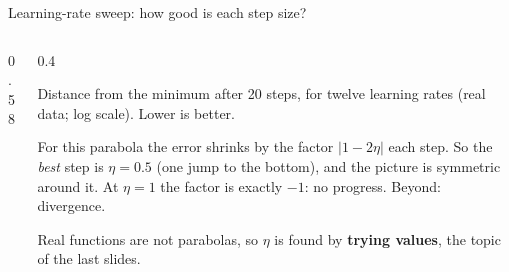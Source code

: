 \documentclass[aspectratio=169,10pt]{beamer}
\begin{document}
\begin{frame}{Learning-rate sweep: how good is each step size?}
\begin{columns}[T]
\begin{column}{0.58\textwidth}
\begin{sfig}[0.85]
\end{sfig}
\end{column}
\begin{column}{0.4\textwidth}
{\small
Distance from the minimum after 20 steps, for twelve learning rates (real data; log scale). Lower is better.

\vspace{2mm}
For this parabola the error shrinks by the factor $|1-2\eta|$ each step. So the \emph{best} step is $\eta=0.5$ (one jump to the bottom), and the picture is symmetric around it. At $\eta=1$ the factor is exactly $-1$: no progress. Beyond: divergence.

\vspace{2mm}
Real functions are not parabolas, so $\eta$ is found by \textbf{trying values}, the topic of the last slides.}
\end{column}
\end{columns}
\end{frame}
\end{document}

